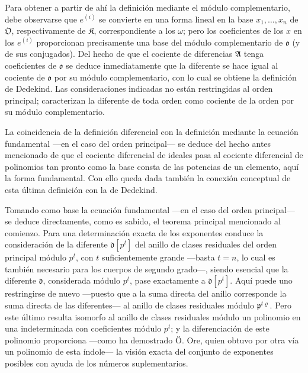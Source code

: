 Para obtener a partir de ahí la definición mediante el módulo complementario, debe observarse que $e^{(i)}$ se convierte en una forma lineal en la base $x_1,\ldots,x_n$ de $\mathfrak O$, respectivamente de $\mathfrak K$, correspondiente a los $\omega$; pero los coeficientes de los $x$ en los $e^{(i)}$ proporcionan precisamente una base del módulo complementario de $\mathfrak o$ (y de sus conjugados). Del hecho de que el cociente de diferencias $\mathfrak A$ tenga coeficientes de $\mathfrak o$ se deduce inmediatamente que la diferente se hace igual al cociente de $\mathfrak o$ por su módulo complementario, con lo cual se obtiene la definición de Dedekind. Las consideraciones indicadas no están restringidas al orden principal; caracterizan la diferente de toda orden como cociente de la orden por su módulo complementario.

La coincidencia de la definición diferencial con la definición mediante la ecuación fundamental ---en el caso del orden principal--- se deduce del hecho antes mencionado de que el cociente diferencial de ideales pasa al cociente diferencial de polinomios tan pronto como la base consta de las potencias de un elemento, aquí la forma fundamental. Con ello queda dada también la conexión conceptual de esta última definición con la de Dedekind.

Tomando como base la ecuación fundamental ---en el caso del orden principal--- se deduce directamente, como es sabido, el teorema principal mencionado al comienzo. Para una determinación exacta de los exponentes conduce la consideración de la diferente $\mathfrak d[p^t]$ del anillo de clases residuales del orden principal módulo $p^t$, con $t$ suficientemente grande ---basta $t=n$, lo cual es también necesario para los cuerpos de segundo grado---, siendo esencial que la diferente $\mathfrak d$, considerada módulo $p^t$, pase exactamente a $\mathfrak d[p^t]$. Aquí puede uno restringirse de nuevo ---puesto que a la suma directa del anillo corresponde la suma directa de las diferentes--- al anillo de clases residuales módulo $\mathfrak p^{t\varrho}$. Pero este último resulta isomorfo al anillo de clases residuales módulo un polinomio en una indeterminada con coeficientes módulo $p^t$; y la diferenciación de este polinomio proporciona ---como ha demostrado Ö. Ore, quien obtuvo por otra vía un polinomio de esta índole--- la visión exacta del conjunto de exponentes posibles con ayuda de los números suplementarios.

